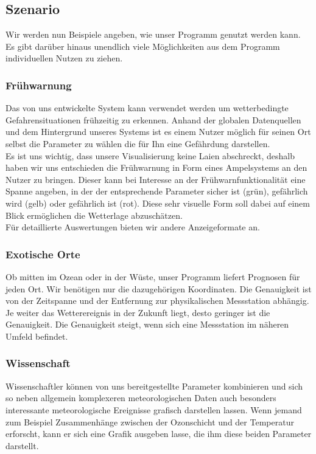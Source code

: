\documentclass[a4paper,oneside,12pt,titlepage]{article}
\begin{document}
\subsection{Szenario} %
Wir werden nun Beispiele angeben, wie unser Programm genutzt werden kann. Es gibt darüber hinaus unendlich viele Möglichkeiten aus dem Programm individuellen Nutzen zu ziehen.

\subsubsection{Frühwarnung} %
Das von uns entwickelte System kann verwendet werden um wetterbedingte Gefahrensituationen frühzeitig zu erkennen. Anhand der globalen Datenquellen und dem Hintergrund unseres Systems ist es einem Nutzer möglich für seinen Ort selbst die Parameter zu wählen die für Ihn eine Gefährdung darstellen.\\
Es ist uns wichtig, dass unsere Visualisierung keine Laien abschreckt, deshalb haben wir uns entschieden die Frühwarnung in Form eines Ampelsystems an den Nutzer zu bringen. Dieser kann bei Interesse an der Frühwarnfunktionalität eine Spanne angeben, in der der entsprechende Parameter sicher ist (grün), gefährlich wird (gelb) oder gefährlich ist (rot). Diese sehr visuelle Form soll dabei auf einem Blick ermöglichen die Wetterlage abzuschätzen.\\
Für detaillierte Auswertungen bieten wir andere Anzeigeformate an.

\subsubsection{Exotische Orte} %
Ob mitten im Ozean oder in der Wüste, unser Programm liefert Prognosen für jeden Ort. Wir benötigen nur die dazugehörigen Koordinaten. Die Genauigkeit ist von der Zeitspanne und der Entfernung zur physikalischen Messstation abhängig. Je weiter das Wetterereignis in der Zukunft liegt, desto geringer ist die Genauigkeit. Die Genauigkeit steigt, wenn sich eine Messstation im näheren Umfeld befindet.

\subsubsection{Wissenschaft} %
Wissenschaftler können von uns bereitgestellte Parameter kombinieren und sich so neben allgemein komplexeren meteorologischen Daten auch besonders interessante meteorologische Ereignisse grafisch darstellen lassen. Wenn jemand zum Beispiel Zusammenhänge zwischen der Ozonschicht und der Temperatur erforscht, kann er sich eine Grafik ausgeben lasse, die ihm diese beiden Parameter darstellt.
\end{document}
